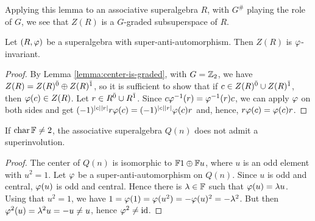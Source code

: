 Applying this lemma to an associative superalgebra $R$, with $G^\#$ playing the role of $G$, we see that $Z(R)$ is a $G$-graded subsuperspace of $R$.


\begin{lemma}
    Let $(R, \varphi)$ be a superalgebra with super-anti-automorphism. 
    Then $Z(R)$ is $\varphi$-invariant.
\end{lemma}

\begin{proof}
    By Lemma \ref{lemma:center-is-graded}, with $G = \mathbb{Z}_2$, we have $Z(R) = Z(R)^{\bar0} \oplus Z(R)^{\bar1}$, so it is sufficient to show that if $c \in Z(R)^{\bar0} \cup Z(R)^{\bar1}$, then $\varphi(c) \in Z(R)$.
    Let $r \in R^{\bar0} \cup R^{\bar1}$. 
    Since $c\varphi^{-1} (r) = \varphi^{-1} (r)c$, we can apply $\varphi$ on both sides and get $(-1)^{|c||r|} r \varphi(c) = (-1)^{|c||r|} \varphi(c) r$ and, hence, $r \varphi(c) = \varphi(c) r$.
\end{proof}

\begin{cor}\label{cor:Q-no-spuerinv-center}
    If $\operatorname{char} \mathbb{F} \neq 2$, the associative superalgebra $Q(n)$ does not admit a superinvolution.
\end{cor}

\begin{proof}
    The center of $Q(n)$ is isomorphic to $\mathbb{F}1 \oplus \mathbb{F} u$, where $u$ is an odd element with $u^2 = 1$. 
    Let $\varphi$ be a super-anti-automorphism on $Q(n)$. 
    Since $u$ is odd and central, $\varphi(u)$ is odd and central. 
    Hence there is $\lambda \in \mathbb{F}$ such that $\varphi(u) = \lambda u$. 
    Using that $u^2 = 1$, we have $1 = \varphi(1) = \varphi(u^2) = - \varphi(u)^2 = - \lambda^2$. 
    But then $\varphi^2 (u) = \lambda^2 u = -u \neq u$, hence $\varphi^2 \neq \operatorname{id}$. 
\end{proof}

